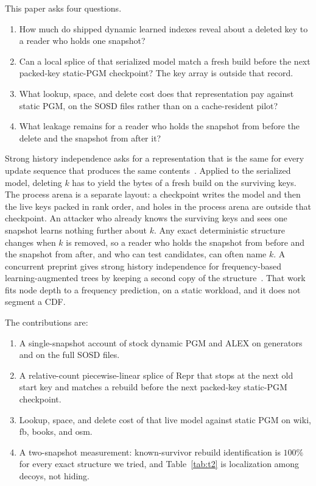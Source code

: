 \documentclass[conference]{IEEEtran}
\begin{document}
This paper asks four questions.
\begin{enumerate}
\item How much do shipped dynamic learned indexes reveal about a deleted key to a reader who holds one snapshot?
\item Can a local splice of that serialized model match a fresh build before the next packed-key static-PGM checkpoint? The key array is outside that record.
\item What lookup, space, and delete cost does that representation pay against static PGM, on the SOSD files rather than on a cache-resident pilot?
\item What leakage remains for a reader who holds the snapshot from before the delete and the snapshot from after it?
\end{enumerate}

Strong history independence asks for a representation that is the same for every update sequence that produces the same contents~\cite{naor2001,hartline2005,blelloch2007}.
Applied to the serialized model, deleting $k$ has to yield the bytes of a fresh build on the surviving keys.
The process arena is a separate layout: a checkpoint writes the model and then the live keys packed in rank order, and holes in the process arena are outside that checkpoint.
An attacker who already knows the surviving keys and sees one snapshot learns nothing further about $k$.
Any exact deterministic structure changes when $k$ is removed, so a reader who holds the snapshot from before and the snapshot from after, and who can test candidates, can often name $k$.
A concurrent preprint gives strong history independence for frequency-based learning-augmented trees by keeping a second copy of the structure~\cite{goyal2025}.
That work fits node depth to a frequency prediction, on a static workload, and it does not segment a CDF.

The contributions are:
\begin{enumerate}
\item A single-snapshot account of stock dynamic PGM and ALEX on generators and on the full SOSD files.
\item A relative-count piecewise-linear splice of $\mathrm{Repr}$ that stops at the next old start key and matches a rebuild before the next packed-key static-PGM checkpoint.
\item Lookup, space, and delete cost of that live model against static PGM on wiki, fb, books, and osm.
\item A two-snapshot measurement: known-survivor rebuild identification is $100\%$ for every exact structure we tried, and Table~\ref{tab:t2} is localization among decoys, not hiding.
\end{enumerate}
\end{document}
